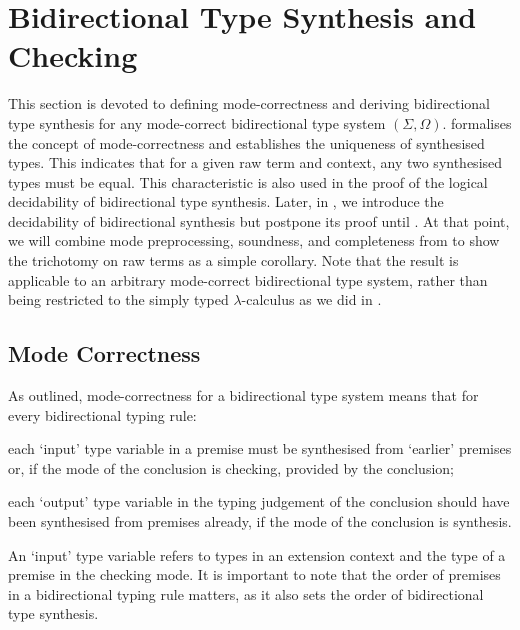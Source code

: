 
\section{Bidirectional Type Synthesis and Checking} \label{sec:type-synthesis}
This section is devoted to defining mode-correctness and deriving bidirectional type synthesis for any mode-correct bidirectional type system $(\Sigma, \Omega)$.
 formalises the concept of mode-correctness and establishes the uniqueness of synthesised types.
This indicates that for a given raw term and context, any two synthesised types must be equal.
This characteristic is also used in the proof of the logical decidability of bidirectional type synthesis.
Later, in , we introduce the decidability of bidirectional synthesis but postpone its proof until .
At that point, we will combine mode preprocessing, soundness, and completeness from  to show the trichotomy on raw terms as a simple corollary.
Note that the result is applicable to an arbitrary mode-correct bidirectional type system, rather than being restricted to the simply typed $\lambda$-calculus as we did in .

\subsection{Mode Correctness}\label{sec:mode-correctness}
As \citet[Section~3.1]{Dunfield2021} outlined, mode-correctness for a bidirectional type system means that for every bidirectional typing rule:
\begin{enumerate*}
\item each `input' type variable in a premise must be synthesised from `earlier' premises or, if the mode of the conclusion is checking, provided by the conclusion;
\item each `output' type variable in the typing judgement of the conclusion should have been synthesised from premises already, if the mode of the conclusion is synthesis.
\end{enumerate*}
An `input' type variable refers to types in an extension context and the type of a premise in the checking mode.
It is important to note that the order of premises in a bidirectional typing rule matters, as it also sets the order of bidirectional type synthesis.

